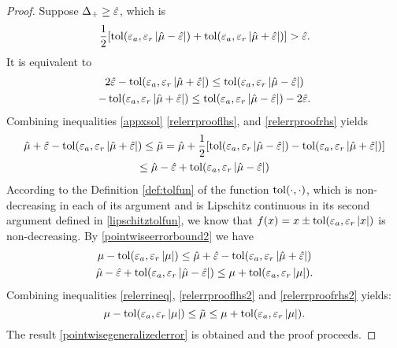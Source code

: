 \documentclass{iitthesis}
\theoremstyle{definition}
\begin{document}
 \begin{proof}
Suppose $\Delta_+\geq \hat{\varepsilon}$, which is
 $$\frac{1}{2} [\operatorname{tol}(\varepsilon_a, \varepsilon_r \left \lvert \hat{\mu}-\hat{\varepsilon} \right \rvert) + \operatorname{tol}(\varepsilon_a, \varepsilon_r \left \lvert \hat{\mu}+\hat{\varepsilon} \right \rvert)] >\hat{\varepsilon}.$$
It is equivalent to
 \begin{gather}
 2\hat{\varepsilon}-\operatorname{tol}(\varepsilon_a, \varepsilon_r \left \lvert \hat{\mu}+\hat{\varepsilon} \right \rvert) \leq \operatorname{tol}(\varepsilon_a, \varepsilon_r \left \lvert \hat{\mu}-\hat{\varepsilon} \right \rvert) \label{relerrprooflhs}\\
 -\operatorname{tol}(\varepsilon_a, \varepsilon_r \left \lvert \hat{\mu}+\hat{\varepsilon} \right \rvert) \leq \operatorname{tol}(\varepsilon_a, \varepsilon_r \left \lvert \hat{\mu}-\hat{\varepsilon} \right \rvert)-2\hat{\varepsilon}. \label{relerrproofrhs}
 \end{gather}
 Combining inequalities \eqref{appxsol} \eqref{relerrprooflhs}, and \eqref{relerrproofrhs} yields
 \begin{multline} \label{relerrineq}
 \hat{\mu}+\hat{\varepsilon} -\operatorname{tol}(\varepsilon_a, \varepsilon_r \left \lvert \hat{\mu}+ \hat{\varepsilon} \right \rvert)\leq \tilde{\mu} = \hat{\mu}+\frac{1}{2} [\operatorname{tol}(\varepsilon_a, \varepsilon_r \left \lvert \hat{\mu}-\hat{\varepsilon} \right \rvert) - \operatorname{tol}(\varepsilon_a, \varepsilon_r \left \lvert \hat{\mu}+\hat{\varepsilon} \right \rvert)] \\ \leq  \hat{\mu}-\hat{\varepsilon} +\operatorname{tol}(\varepsilon_a, \varepsilon_r \left \lvert \hat{\mu}-\hat{\varepsilon} \right \rvert)
 \end{multline}
 According to the Definition \ref{def:tolfun} of the function $\operatorname{tol}(\cdot, \cdot)$, which is non-decreasing in each of its argument and is Lipschitz continuous in its second argument defined in \eqref{lipschitztolfun}, we know that $f(x) = x \pm \operatorname{tol}(\varepsilon_a,\varepsilon_r\left \lvert x \right \rvert)$ is non-decreasing. By \eqref{pointwiseerrorbound2} we have 
 \begin{gather}
 \mu-\operatorname{tol}(\varepsilon_a, \varepsilon_r \left \lvert \mu \right \rvert) \leq \hat{\mu}+\hat{\varepsilon} -\operatorname{tol}(\varepsilon_a, \varepsilon_r \left \lvert \hat{\mu}+ \hat{\varepsilon} \right \rvert) \label{relerrprooflhs2}\\
\hat{\mu}-\hat{\varepsilon} +\operatorname{tol}(\varepsilon_a, \varepsilon_r \left \lvert \hat{\mu}- \hat{\varepsilon} \right \rvert) \leq \mu+\operatorname{tol}(\varepsilon_a, \varepsilon_r \left \lvert \mu \right \rvert).\label{relerrproofrhs2}
 \end{gather}
Combining inequalities \eqref{relerrineq}, \eqref{relerrprooflhs2} and \eqref{relerrproofrhs2} yields:
\begin{equation} 
 \mu -\operatorname{tol}(\varepsilon_a, \varepsilon_r \left \lvert \mu \right \rvert)\leq \tilde{\mu} \leq  \mu +\operatorname{tol}(\varepsilon_a, \varepsilon_r\left \lvert \mu \right \rvert).
 \end{equation}
The result \eqref{pointwisegeneralizederror} is obtained and the proof proceeds.
\end{proof}
\end{document}
